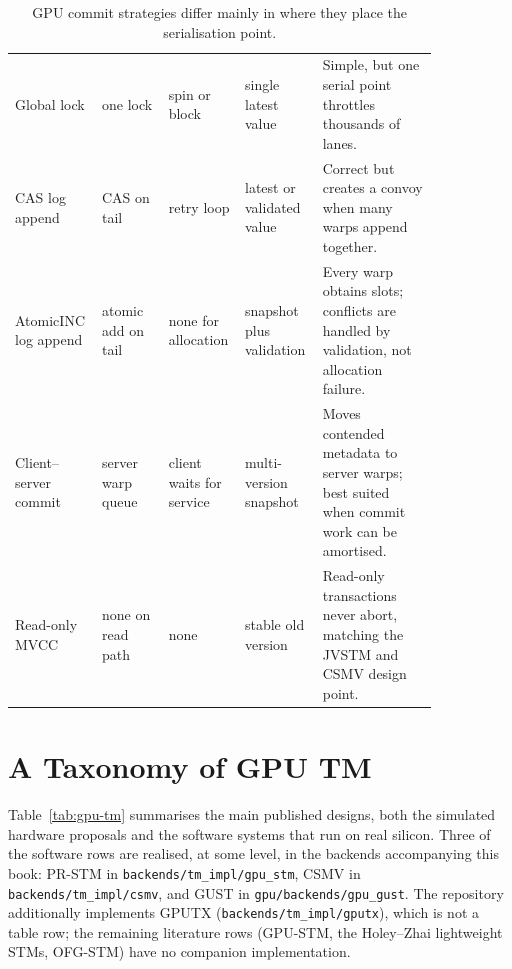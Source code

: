 \begin{table}[htbp]
\centering
\begin{tabular}{M{0.14\linewidth}M{0.15\linewidth}M{0.13\linewidth}M{0.16\linewidth}M{0.26\linewidth}}
\hline
{} &  &  &  &  \\
\hline
Global lock & one lock & spin or block & single latest value &
Simple, but one serial point throttles thousands of lanes. \\
CAS log append & CAS on tail & retry loop & latest or validated value &
Correct but creates a convoy when many warps append together. \\
AtomicINC log append & atomic add on tail & none for allocation & snapshot plus validation &
Every warp obtains slots; conflicts are handled by validation, not allocation failure. \\
Client--server commit & server warp queue & client waits for service & multi-version snapshot &
Moves contended metadata to server warps; best suited when commit work can be amortised. \\
Read-only MVCC & none on read path & none & stable old version &
Read-only transactions never abort, matching the JVSTM and CSMV design point. \\
\hline
\end{tabular}
\caption{GPU commit strategies differ mainly in where they place the serialisation point.}
\label{tab:gpu-commit-strategies}
\end{table}


\section{A Taxonomy of GPU TM}
\label{sec:taxonomy}

Table~\ref{tab:gpu-tm} summarises the main published designs, both the
simulated hardware proposals and the software systems that run on real
silicon. Three of the software rows are realised, at some level, in the
backends accompanying this book: PR-STM in
\texttt{backends\slash{}tm\_impl\slash{}gpu\_stm}, CSMV in \texttt{backends\slash{}tm\_impl\slash{}csmv},
and GUST in \texttt{gpu\slash{}backends\slash{}gpu\_gust}. The repository
additionally implements GPUTX
(\texttt{backends\slash{}tm\_impl\slash{}gputx}), which is not a table row;
the remaining literature rows (GPU-STM, the Holey--Zhai lightweight STMs,
OFG-STM) have no companion implementation.

